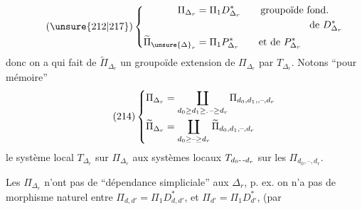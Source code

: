 \[
\tag{\unsure{212|217}}
\left\{\begin{aligned}
\Pi_{\Delta_r}&=\Pi_1D^*_{\Delta_r}\qquad\text{groupoïde fond.}\\
&\hspace{4cm}\text{de }D^*_{\Delta_r}\\
\widetilde\Pi_{\unsure{\Delta}_r}&=\Pi_1P^*_{\Delta_r}\qquad\text{et de }P^*_{\Delta_r}
\end{aligned}\right.
\]
donc on a
qui fait de $\widetilde\Pi_{\Delta_r}$ un groupoïde
extension de $\Pi_{\Delta_r}$ par $T_{\Delta_r}$.
Notons ``pour mémoire''
\[
\tag{214}
\left\{\begin{aligned}
\Pi_{\Delta_r}&=\coprod_{d_0\geq d_1\geq\mathord{\text{.\,--}}\geq d_r}\Pi_{d_0,d_1,,\text{--},d_r}\\
\widetilde\Pi_{\Delta_r}&=\coprod_{d_0\geq\text{--}\geq d_r}\widetilde\Pi_{d_0,d_1,\text{--},d_r}
\end{aligned}\right.
\]
le système local $T_{\Delta_r}$ sur $\Pi_{\Delta_r}$ 
 aux systèmes locaux
$T_{d_0\text{-\,-}d_r}$ sur les $\Pi_{d_0,\text{--},d_r}$.

Les $\Pi_{\Delta_r}$ n'ont pas de ``dépendance
simpliciale''  aux $\Delta_r$, p. ex. on n'a
pas de morphisme naturel entre
$\Pi_{d,d'}=\Pi_1D^*_{d,d'}$, et $\Pi_{d'}=\Pi_1D^*_{d'}$, (par
